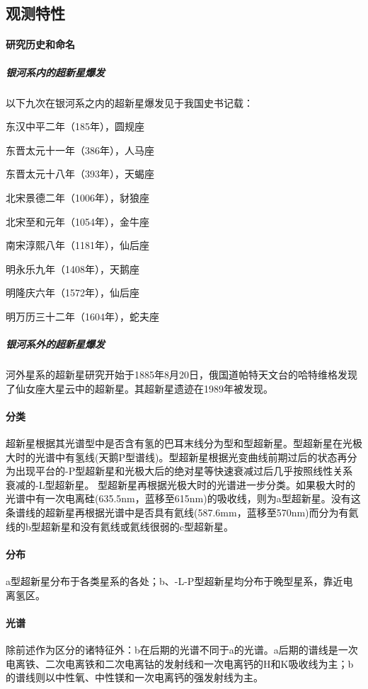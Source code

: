 \subsection{观测特性}
\paragraph{研究历史和命名}
\subparagraph{银河系内的超新星爆发}以下九次在银河系之内的超新星爆发见于我国史书记载：

东汉中平二年（185年），圆规座

东晋太元十一年（386年），人马座

东晋太元十八年（393年），天蝎座

北宋景德二年（1006年），豺狼座

北宋至和元年（1054年），金牛座

南宋淳熙八年（1181年），仙后座

明永乐九年（1408年），天鹅座

明隆庆六年（1572年），仙后座

明万历三十二年（1604年），蛇夫座
\subparagraph{银河系外的超新星爆发}河外星系的超新星研究开始于1885年8月20日，俄国道帕特天文台的哈特维格发现了仙女座大星云中的超新星。其超新星遗迹在1989年被发现。
\paragraph{分类}超新星根据其光谱型中是否含有氢的巴耳末线分为型和型超新星。型超新星在光极大时的光谱中有氢线(天鹅P型谱线)。型超新星根据光变曲线前期过后的状态再分为出现平台的-P型超新星和光极大后的绝对星等快速衰减过后几乎按照线性关系衰减的-L型超新星。
型超新星再根据光极大时的光谱进一步分类。如果极大时的光谱中有一次电离硅(635.5nm，蓝移至615nm)的吸收线，则为a型超新星。没有这条谱线的超新星再根据光谱中是否具有氦线(587.6mm，蓝移至570nm)而分为有氦线的b型超新星和没有氦线或氦线很弱的c型超新星。
\paragraph{分布}a型超新星分布于各类星系的各处；b、-L-P型超新星均分布于晚型星系，靠近电离氢区。
\paragraph{光谱}除前述作为区分的诸特征外：b在后期的光谱不同于a的光谱。a后期的谱线是一次电离铁、二次电离铁和二次电离钴的发射线和一次电离钙的H和K吸收线为主；b的谱线则以中性氧、中性镁和一次电离钙的强发射线为主。
